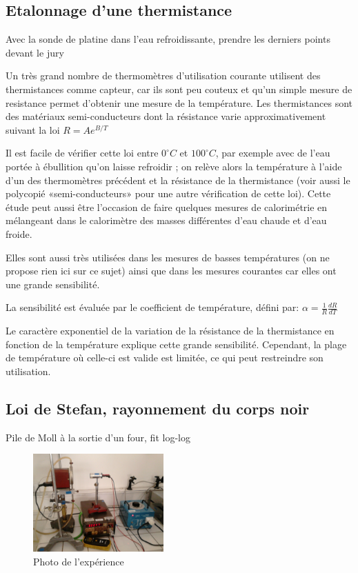 \documentclass{article}%
\begin{document}
\subsection{Etalonnage d'une thermistance}
Avec la sonde de platine dans l'eau refroidissante, prendre les derniers points devant le jury

Un très grand nombre de thermomètres d'utilisation courante utilisent des thermistances comme capteur, car ils sont peu couteux et qu'un simple mesure de resistance permet d'obtenir une mesure de la température. Les thermistances sont des matériaux semi-conducteurs dont la résistance varie approximativement suivant la loi $R = A e^{B/ T}$

Il est facile de vérifier cette loi entre $0^\circ C$ et $100^\circ C$, par exemple avec de l'eau portée à ébullition qu'on laisse refroidir ; on relève alors la température à l'aide d'un des thermomètres précédent et la résistance de la thermistance (voir aussi le polycopié «semi-conducteurs» pour une autre vérification de cette loi). Cette étude peut aussi être l'occasion de faire quelques mesures de calorimétrie en mélangeant dans le calorimètre des masses différentes d'eau chaude et d'eau froide.

Elles sont aussi très utilisées dans les mesures de basses températures (on ne propose rien ici sur ce sujet) ainsi que dans les mesures courantes car elles ont une grande sensibilité.

La sensibilité est évaluée par le coefficient de température, défini par:
$\alpha = \frac{1}{R}\frac{dR}{dT}$


Le caractère exponentiel de la variation de la résistance de la thermistance en fonction de la température explique cette grande sensibilité. Cependant, la plage de température où celle-ci est valide est limitée, ce qui peut restreindre son utilisation. 

\subsection{Loi de Stefan, rayonnement du corps noir}
Pile de Moll à la sortie d'un four, fit log-log


\begin{figure}
	\centerline{\includegraphics[width=5cm]{images-exp/pile_Moll.jpg}}
	\caption{Photo de l'expérience}
\end{figure}
\end{document}
